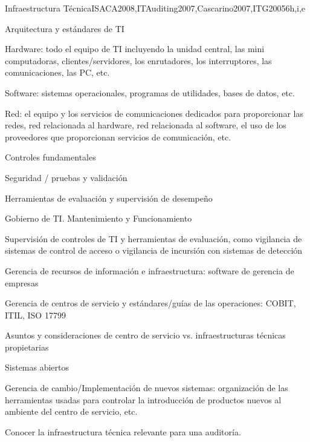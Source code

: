\begin{syllabus}
    \begin{unit}{Infraestructura Técnica}{}{ISACA2008,ITAuditing2007,Cascarino2007,ITG2005}{6}{h,i,e}
    \begin{topics}
    \item Arquitectura y estándares de TI
    \item Hardware: todo el equipo de TI incluyendo la unidad central, las mini computadoras, clientes/servidores, los enrutadores, los interruptores, las comunicaciones, las PC, etc.
    \item Software: sistemas operacionales, programas de utilidades, bases de datos, etc.
    \item Red: el equipo y los servicios de comunicaciones dedicados para proporcionar las redes, red relacionada al hardware, red relacionada al software, el uso de los proveedores que proporcionan servicios de comunicación, etc.
    \item Controles fundamentales
    \item Seguridad / pruebas y validación
    \item Herramientas de evaluación y supervisión de desempeño
    \item Gobierno de TI. Mantenimiento y Funcionamiento
    \item Supervisión de controles de TI y herramientas de evaluación, como vigilancia de sistemas de control de acceso o vigilancia de incursión con sistemas de detección
    \item Gerencia de recursos de información e infraestructura: software de gerencia de empresas
    \item Gerencia de centros de servicio y estándares/guías de las operaciones: COBIT, ITIL, ISO 17799
    \item Asuntos y consideraciones de centro de servicio vs. infraestructuras técnicas propietarias 
    \item Sistemas abiertos
    \item Gerencia de cambio/Implementación de nuevos sistemas: organización de las herramientas usadas para controlar la introducción de productos nuevos al ambiente del centro de servicio, etc.
    \end{topics}
    \begin{learningoutcomes}
    \item Conocer la infraestructura técnica relevante para una auditoría.
    \end{learningoutcomes}
    \end{unit}
    

\end{syllabus}
